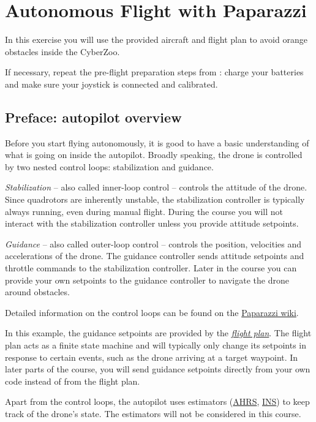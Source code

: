 \chapter{Autonomous Flight with Paparazzi}
\label{ch:autonomous_flight}

In this exercise you will use the provided aircraft and flight plan to avoid orange obstacles inside the CyberZoo.

If necessary, repeat the pre-flight preparation steps from : charge your batteries and make sure your joystick is connected and calibrated.

\section{Preface: autopilot overview}
Before you start flying autonomously, it is good to have a basic understanding of what is going on inside the autopilot. Broadly speaking, the drone is controlled by two nested control loops: stabilization and guidance.

\emph{Stabilization} -- also called inner-loop control -- controls the attitude of the drone. Since quadrotors are inherently unstable, the stabilization controller is typically always running, even during manual flight. During the course you will not interact with the stabilization controller unless you provide attitude setpoints.

\emph{Guidance} -- also called outer-loop control -- controls the position, velocities and accelerations of the drone. The guidance controller sends attitude setpoints and throttle commands to the stabilization controller. Later in the course you can provide your own setpoints to the guidance controller to navigate the drone around obstacles.

Detailed information on the control loops can be found on the \href{http://wiki.paparazziuav.org/wiki/Control_Loops#Rotorcraft_autopilot}{Paparazzi wiki}.

In this example, the guidance setpoints are provided by the \href{https://wiki.paparazziuav.org/wiki/Flight_Plans}{\emph{flight plan}}. The flight plan acts as a finite state machine and will typically only change its setpoints in response to certain events, such as the drone arriving at a target waypoint. In later parts of the course, you will send guidance setpoints directly from your own code instead of from the flight plan.

Apart from the control loops, the autopilot uses estimators (\href{http://wiki.paparazziuav.org/wiki/Subsystem/ahrs}{AHRS}, \href{http://wiki.paparazziuav.org/wiki/Subsystem/ins}{INS}) to keep track of the drone's state. The estimators will not be considered in this course.

